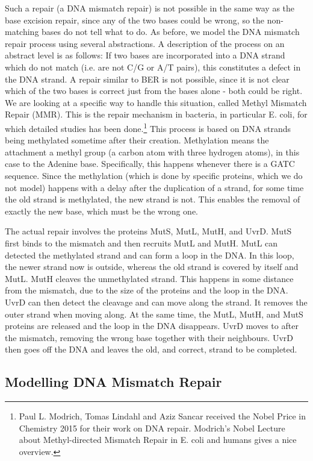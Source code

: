 Such a repair (a DNA mismatch repair) is not possible in the same way as the base excision repair, since any of the two bases could be wrong, so the non-matching  bases do not tell what to do. As before, we model the DNA mismatch repair process using several abstractions. A description of the process on an abstract level is as follows: If two bases are incorporated into a DNA strand which do not match (i.e. are not C/G or A/T pairs), this constitutes a defect in the DNA strand. A repair similar to BER is not possible, since it is not clear which of the two bases is correct just from the bases alone - both could be right. We are looking at a specific way to handle this situation, called Methyl Mismatch Repair (MMR). This is the repair mechanism in bacteria, in particular E. coli, for which detailed studies has been done.\footnote{Paul L. Modrich, Tomas Lindahl and Aziz Sancar received the Nobel Price in Chemistry 2015 for their work on DNA repair. Modrich's Nobel Lecture about Methyl-directed Mismatch Repair in E. coli and humans \cite{pmid27198632} gives a nice overview.} This process is based on DNA strands being methylated sometime after their creation. Methylation means the attachment a methyl group (a carbon atom with three hydrogen atoms), in this case to the Adenine base. Specifically, this happens whenever there is a GATC sequence. Since the methylation (which is done by specific proteins, which we do not model) happens with a delay after the duplication of a strand, for some time the old strand is methylated, the new strand is not. This enables the removal of exactly the new base, which must be the wrong one.

The actual repair involves the proteins MutS, MutL, MutH, and UvrD. MutS first binds to the mismatch and then recruits MutL and MutH. MutL can detected the methylated strand and can form a loop in the DNA. In this loop, the newer strand now is outside, whereas the old strand is covered by itself and MutL. MutH cleaves the unmethylated strand. This happens in some distance from the mismatch, due to the size of the proteins and the loop in the DNA. UvrD can then detect the cleavage and can move along the strand. It removes the outer strand when moving along. At the same time, the MutL, MutH, and MutS proteins are released and the loop in the DNA disappears. UvrD moves to after the mismatch, removing the wrong base together with their neighbours. UvrD then goes off the DNA and leaves the old, and correct, strand to be completed. 

\subsection{Modelling DNA Mismatch Repair}

